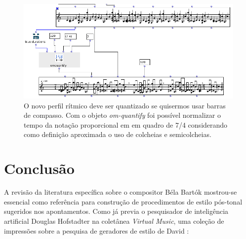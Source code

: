 \documentclass[
	12pt,				%
	openright,			%
	twoside,			%
	a4paper,			%
	english,			%
	french,				%
	spanish,			%
	brazil				%
	]{abntex2}
\begin{document}
\pagebreak
\begin{figure}[!h]
	\caption{\label{fig_grafico}O novo perfil rítmico deve ser quantizado se quisermos usar barras de compasso. Com o objeto \textit{om-quantify} foi possível normalizar o tempo da notação proporcional em em quadro de 7/4 considerando como definição aproximada o uso de colcheias e semicolcheias.  }
	\begin{center}
	    \includegraphics[scale=0.65]{OMPD/OMquantify.png}
	\end{center}
\end{figure}



\chapter*[Conclusão]{Conclusão}
\label{conclusao}

A revisão da literatura específica sobre o compositor Béla Bartók mostrou-se essencial como referência para construção de procedimentos de estilo pós-tonal sugeridos nos apontamentos. Como já previa o pesquisador de inteligência artificial Douglas Hofstadter na coletânea \textit{Virtual Music}, uma coleção de impressões sobre a pesquisa de geradores de estilo de David  :
\end{document}
